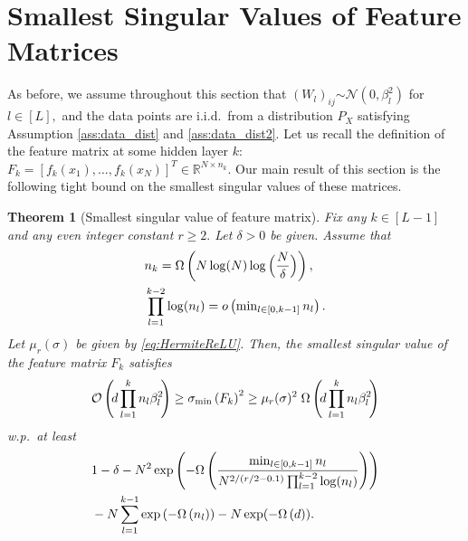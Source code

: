 \documentclass[11pt]{article}
\newcommand{\revision}[1]{#1}
\def\RR{\mathbb{R}}
\newcommand{\distas}[1]{\mathbin{\overset{#1}{\sim}}}
\newtheorem{theorem}{Theorem}[section]
\newtheorem{claim}[theorem]{Claim}
\newcommand{\littleO}[1]{o\left(#1\right)}
\newcommand{\bigO}[1]{\mathcal{O}\left(#1\right)}
\newcommand{\bigOmg}[1]{\Omega\left(#1\right)}
\newcommand{\bigTheta}[1]{\Theta\left(#1\right)}
\newcommand{\bigexp}[1]{\exp\left(#1\right)}
\newcommand{\norm}[1]{\left\|#1\right\|}
\newcommand{\svmin}[1]{\sigma_{\rm min}\left(#1\right)}
\def\min{\mathop{\rm min}\nolimits}
\begin{document}
   
\section{Smallest Singular Values of Feature Matrices}\label{sec:svmin_Fk}
As before, we assume throughout this section that $(W_l)_{ij}\distas{}\mathcal{N}(0,\beta_l^2)$ for $l\in[L],$ 
and the data points are i.i.d.\ from a distribution $P_X$ satisfying Assumption \ref{ass:data_dist} and \ref{ass:data_dist2}. 
Let us recall the definition of the feature matrix at some hidden layer $k$: $F_k=[f_k(x_1),\ldots,f_k(x_N)]^T\in\RR^{N\times n_k}.$
Our main result of this section is the following tight bound on the smallest singular values of these matrices.

\begin{theorem}[Smallest singular value of feature matrix]\label{thm:bound_svmin_Fk}
    Fix any $k\in[L-1]$ and any even integer constant $r\ge 2.$
    Let $\delta>0$ be given.
    Assume that
    \begin{align}
	&n_k = \bigOmg{N\log(N) \log\Big(\frac{N}{\delta}\Big)},\\
	&\prod_{l=1}^{k-2} \log(n_l)=\littleO{\min_{l\in[0,k-1]} n_l}.
    \end{align}
    Let $\mu_r(\sigma)$ be given by \eqref{eq:HermiteReLU}.
    Then, the smallest singular value of the feature matrix $F_k$ satisfies
    \begin{align*}
	\bigO{ \hspace{-.2em}d\prod_{l=1}^{k} n_l\beta_l^2 \hspace{-.2em}} 
	\ge \svmin{F_k}^2 
	\ge \mu_r(\sigma)^2\; \bigOmg{\hspace{-.2em} d\prod_{l=1}^{k} n_l\beta_l^2 \hspace{-.2em}}
    \end{align*}
    w.p.\ at least
    \begin{align*}
	&1 - \delta - N^2 \bigexp{ - \bigOmg{ \frac{\min_{l\in[0,k-1]}n_l}{N^{2/(\revision{r/2}-0.1)} \prod_{l=1}^{k-2}\log(n_l)} } }\\
	&- N \sum_{l=1}^{k-1} \bigexp{-\bigOmg{n_l}} - N \exp(-\bigOmg{d}) .
    \end{align*}
\end{theorem}
\end{document}
